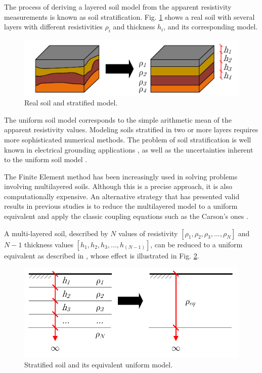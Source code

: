 \documentclass[conference]{IEEEtran}
\begin{document}
	The process of deriving a layered soil model from the apparent resistivity measurements is known as soil stratification. Fig. \ref{fig:EstratSolo} shows a real soil with several layers with different resistivities $\rho_i$ and thickness $h_i$, and its corresponding model.
	
	\begin{figure}[!hbt]
		\begin{center}
			\includegraphics[width=1\columnwidth]{fig/EstratSolo2.pdf}
			\caption{Real soil and stratified model.}
			\label{fig:EstratSolo}
		\end{center}
	\end{figure}
	
	The uniform soil model corresponds to the simple arithmetic mean of the apparent resistivity values. Modeling soils stratified in two or more layers requires more sophisticated numerical methods. The problem of soil stratification is well known in electrical grounding applications \cite{He2012}, as well as the uncertainties inherent to the uniform soil model \cite{IEEEStd80}.
	
	The Finite Element method has been increasingly used in solving problems involving multilayered soils. Although this is a precise approach, it is also computationally expensive. An alternative strategy that has presented valid results in previous studies is to reduce the multilayered model to a uniform equivalent and apply the classic coupling equations such as the Carson's ones \cite{Furlan2015}.
	
	A multi-layered soil, described by $N$ values of resistivity $[\rho_1, \rho_2, \rho_3, ..., \rho_N]$ and $N-1$ thickness values $[h_1, h_2, h_3, ..., h_{(N-1)}]$, can be reduced to a uniform equivalent as described in \cite{Martins-Britto2019}, whose effect is illustrated in Fig. \ref{fig:Hummel}.
	
	\begin{figure}[!hbt]
		\begin{center}
			\includegraphics[width=1\columnwidth]{fig/Hummel2.pdf}
			\caption{Stratified soil and its equivalent uniform model.}
			\label{fig:Hummel}
		\end{center}
	\end{figure}
	
\end{document}
